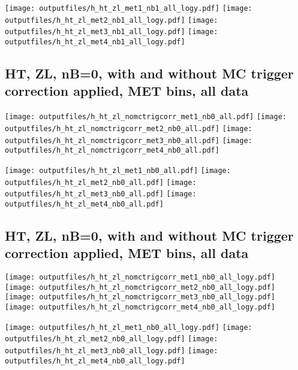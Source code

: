 \documentclass[11pt]{article}
\begin{document}
    \noindent
     \texttt{[image: outputfiles/h\_ht\_zl\_met1\_nb1\_all\_logy.pdf]}
     \texttt{[image: outputfiles/h\_ht\_zl\_met2\_nb1\_all\_logy.pdf]}
     \texttt{[image: outputfiles/h\_ht\_zl\_met3\_nb1\_all\_logy.pdf]}
     \texttt{[image: outputfiles/h\_ht\_zl\_met4\_nb1\_all\_logy.pdf]}

   \clearpage
     \subsection{ HT, ZL, nB=0, with and without MC trigger correction applied, MET bins, all data}

    \noindent
     \texttt{[image: outputfiles/h\_ht\_zl\_nomctrigcorr\_met1\_nb0\_all.pdf]}
     \texttt{[image: outputfiles/h\_ht\_zl\_nomctrigcorr\_met2\_nb0\_all.pdf]}
     \texttt{[image: outputfiles/h\_ht\_zl\_nomctrigcorr\_met3\_nb0\_all.pdf]}
     \texttt{[image: outputfiles/h\_ht\_zl\_nomctrigcorr\_met4\_nb0\_all.pdf]}

    \noindent
     \texttt{[image: outputfiles/h\_ht\_zl\_met1\_nb0\_all.pdf]}
     \texttt{[image: outputfiles/h\_ht\_zl\_met2\_nb0\_all.pdf]}
     \texttt{[image: outputfiles/h\_ht\_zl\_met3\_nb0\_all.pdf]}
     \texttt{[image: outputfiles/h\_ht\_zl\_met4\_nb0\_all.pdf]}

   \clearpage
     \subsection{ HT, ZL, nB=0, with and without MC trigger correction applied, MET bins, all data}

    \noindent
     \texttt{[image: outputfiles/h\_ht\_zl\_nomctrigcorr\_met1\_nb0\_all\_logy.pdf]}
     \texttt{[image: outputfiles/h\_ht\_zl\_nomctrigcorr\_met2\_nb0\_all\_logy.pdf]}
     \texttt{[image: outputfiles/h\_ht\_zl\_nomctrigcorr\_met3\_nb0\_all\_logy.pdf]}
     \texttt{[image: outputfiles/h\_ht\_zl\_nomctrigcorr\_met4\_nb0\_all\_logy.pdf]}

    \noindent
     \texttt{[image: outputfiles/h\_ht\_zl\_met1\_nb0\_all\_logy.pdf]}
     \texttt{[image: outputfiles/h\_ht\_zl\_met2\_nb0\_all\_logy.pdf]}
     \texttt{[image: outputfiles/h\_ht\_zl\_met3\_nb0\_all\_logy.pdf]}
     \texttt{[image: outputfiles/h\_ht\_zl\_met4\_nb0\_all\_logy.pdf]}
\end{document}
